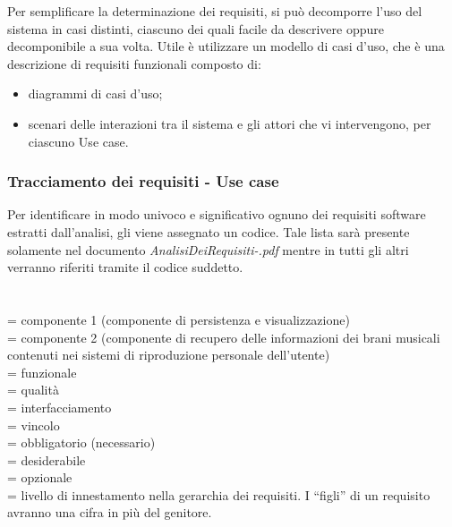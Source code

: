 Per semplificare la determinazione dei requisiti, si pu\`o decomporre l'uso
del sistema in casi distinti, ciascuno dei quali facile da
descrivere oppure decomponibile a sua volta.
Utile \`e utilizzare un modello di casi d'uso, che \`e una descrizione di
requisiti funzionali composto di:
\begin{itemize}
  \item diagrammi di casi d'uso;
  \item scenari delle interazioni tra il sistema e gli attori che vi
  intervengono, per ciascuno Use case.
\end{itemize}

\subsubsection{Tracciamento dei requisiti - Use case}
Per identificare in modo univoco e significativo ognuno dei requisiti software
estratti dall'analisi, gli viene assegnato un codice.
Tale lista sar\`a presente solamente nel documento
\emph{AnalisiDeiRequisiti-\versioneAR.pdf} mentre in tutti gli altri verranno
riferiti tramite il codice suddetto.
\\
\\
\\
 = componente 1 (componente di persistenza e visualizzazione)\\
 = componente 2 (componente di recupero delle informazioni dei brani
musicali contenuti nei sistemi di riproduzione personale dell'utente)\\
 = funzionale\\
 = qualit\`a\\
 = interfacciamento\\
 = vincolo\\
 = obbligatorio (necessario)\\
 = desiderabile\\
 = opzionale\\
 = livello di innestamento nella gerarchia dei requisiti. I ``figli'' di
un requisito avranno una cifra in pi\`u del genitore.

\newpage
